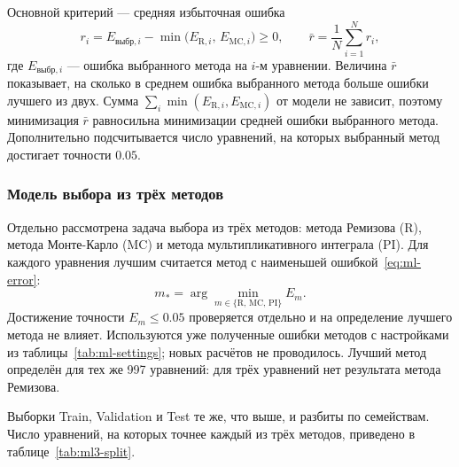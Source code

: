 \documentclass[14pt,a4paper]{extarticle}
\begin{document}
Основной критерий --- средняя избыточная ошибка
\begin{equation}\label{eq:ml-regret}
r_i=E_{\text{выбр},i}-\min\bigl(E_{\mathrm{R},i},\,E_{\mathrm{MC},i}\bigr)\ge0,\qquad
\bar r=\frac1N\sum_{i=1}^N r_i,
\end{equation}
где $E_{\text{выбр},i}$ --- ошибка выбранного метода на $i$-м уравнении.
Величина $\bar r$ показывает, на сколько в среднем ошибка выбранного
метода больше ошибки лучшего из двух. Сумма
$\sum_i\min(E_{\mathrm{R},i},E_{\mathrm{MC},i})$ от модели не зависит,
поэтому минимизация $\bar r$ равносильна минимизации средней ошибки
выбранного метода. Дополнительно подсчитывается число уравнений,
на которых выбранный метод достигает точности $0.05$.

\subsubsection{Модель выбора из трёх методов}\label{sec:ml3-setup}
Отдельно рассмотрена задача выбора из трёх методов: метода Ремизова
($\mathrm{R}$), метода Монте-Карло ($\mathrm{MC}$) и метода
мультипликативного интеграла ($\mathrm{PI}$). Для каждого уравнения
лучшим считается метод с наименьшей ошибкой~\eqref{eq:ml-error}:
\[
m_*=\arg\min_{m\in\{\mathrm{R},\,\mathrm{MC},\,\mathrm{PI}\}}E_m .
\]
Достижение точности $E_m\le0.05$ проверяется отдельно и на определение
лучшего метода не влияет. Используются уже полученные ошибки методов
с настройками из таблицы~\ref{tab:ml-settings}; новых расчётов
не проводилось. Лучший метод определён для тех же 997 уравнений: для трёх
уравнений нет результата метода Ремизова.

Выборки Train, Validation и Test те же, что выше, и разбиты
по семействам. Число уравнений, на которых точнее каждый из трёх
методов, приведено в таблице~\ref{tab:ml3-split}.

\begin{table}[!htbp]
\centering
\caption{Число уравнений, на которых каждый из трёх методов даёт
наименьшую ошибку в точке $x=0$.}
\label{tab:ml3-split}
\end{table}
\end{document}
